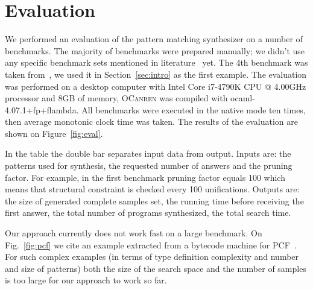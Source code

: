\section{Evaluation}
\label{sec:eval}


We performed an evaluation of the pattern matching synthesizer on a number of benchmarks.
The majority of benchmarks were prepared manually; we didn't use any specific benchmark sets mentioned in literature~\cite{Scott2000WhenDM} yet.
The 4th benchmark was taken from~\cite{maranget2008}, we used it in Section~\ref{sec:intro} as the first example. 
The evaluation was performed on a desktop computer with Intel Core i7-4790K CPU @ 4.00GHz processor and 8GB of memory,
\textsc{OCanren} was compiled with \mbox{ocaml-4.07.1+fp+flambda}. All benchmarks were executed in the native mode ten times,
then average monotonic clock time was taken. The results of the evaluation are shown on Figure~\ref{fig:eval}.

In the table the double bar separates input data from output. Inputs are: the patterns used for synthesis,
the requested number of answers and the pruning factor. For example, in the first benchmark pruning factor equals 100 which means that structural constraint is checked every 100 unifications. Outputs are: the size of generated complete samples set, the running time before receiving the
first answer, the total number of programs synthesized, the total search time.

Our approach currently does not work fast on a large benchmark. On Fig.~\ref{fig:pcf} we cite an example extracted from a bytecode
machine for PCF~\cite{Plotkin1977LCFCA,maranget2008}. For such complex examples (in terms of type definition complexity and number and size of patterns)
both the size of the search space and the number of samples is too large for our approach to work so far.



